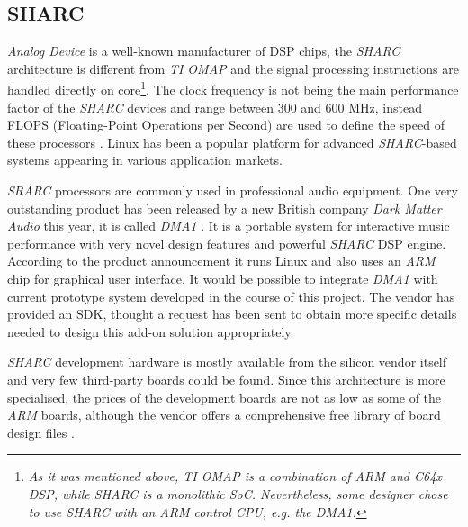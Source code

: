 \subsection{SHARC}

  \emph{Analog Device} is a well-known manufacturer of DSP chips, the
 \emph{SHARC} architecture is different from \emph{TI OMAP} and the
 signal processing instructions are handled directly on core\footnote{%
 \emph{As it was mentioned above, TI OMAP is a combination of ARM and
 C64x DSP, while SHARC is a monolithic SoC. Nevertheless, some designer
 chose to use SHARC with an ARM control CPU, e.g. the DMA1.}}.
 The clock frequency is not being the main performance factor of the
 \emph{SHARC} devices and range between 300 and 600 MHz, instead FLOPS
 (Floating-Point Operations per Second) are used to define the speed of
 these processors \cite{links:adi:sharc}.
 Linux has been a popular platform for advanced \emph{SHARC}-based systems
 appearing in various application markets. %


  \emph{SRARC} processors are commonly used in professional audio
 equipment. One very outstanding product has been released by
 a new British company \emph{Dark Matter Audio} this year, it is
 called \emph{DMA1} \cite{links:dma1}.
 It is a portable  system for interactive music performance with
 very novel design features and powerful \emph{SHARC} DSP engine.
 According to the product announcement it runs Linux and also
 uses an \emph{ARM} chip for graphical user interface. It would be
 possible to integrate \emph{DMA1} with current prototype system
 developed in the course of this project. The vendor has provided
 an SDK, thought a request has been sent to obtain more specific
 details needed to design this add-on solution appropriately.


  \emph{SHARC} development hardware is mostly available from the
 silicon vendor itself and very few third-party boards could be found.
 Since this architecture is more specialised, the prices of the 
 development boards are not as low as some of the \emph{ARM} boards,
 although the vendor offers a comprehensive free library of board
 design files \cite{links:adi:freepcb}.



